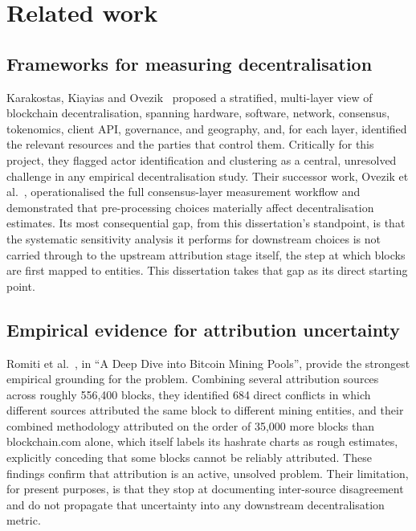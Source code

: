 \documentclass[logo,msc]{infthesis}           %
\begin{document}
\section{Related work}
\label{sec:bg-related}
 
\subsection{Frameworks for measuring decentralisation}
 
Karakostas, Kiayias and Ovezik~\cite{ovezik2022sok} proposed a stratified,
multi-layer view of blockchain decentralisation, spanning hardware,
software, network, consensus, tokenomics, client API, governance, and geography,
and, for each layer, identified the relevant resources and the parties that
control them. Critically for this project, they flagged actor identification
and clustering as a central, unresolved challenge in any empirical
decentralisation study. Their successor work, Ovezik et
al.~\cite{ovezik2025sok}, operationalised the full consensus-layer measurement
workflow and demonstrated that pre-processing choices materially affect
decentralisation estimates. Its most consequential gap, from this
dissertation's standpoint, is that the systematic sensitivity analysis it
performs for downstream choices is not carried through to the upstream
attribution stage itself, the step at which blocks are first mapped to
entities. This dissertation takes that gap as its direct starting point.
 
\subsection{Empirical evidence for attribution uncertainty}
 
Romiti et al.~\cite{romiti2019deep}, in ``A Deep Dive into Bitcoin Mining
Pools'', provide the strongest empirical grounding for the problem. Combining
several attribution sources across roughly 556{,}400 blocks, they identified
684 direct conflicts in which different sources attributed the same block to
different mining entities, and their combined methodology attributed on the
order of 35{,}000 more blocks than blockchain.com alone, which itself labels
its hashrate charts as rough estimates, explicitly conceding that some blocks
cannot be reliably attributed. These findings confirm that attribution is an
active, unsolved problem. Their limitation, for present purposes, is that they
stop at documenting inter-source disagreement and do not propagate that
uncertainty into any downstream decentralisation metric.
 
\end{document}
